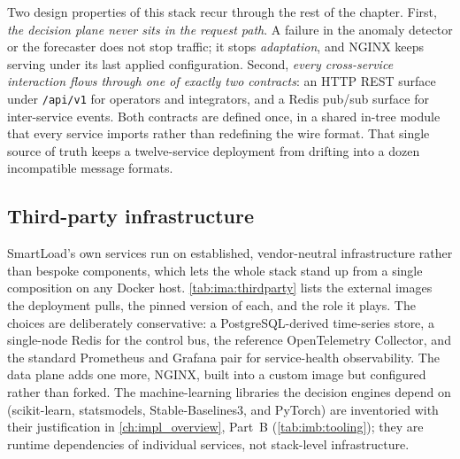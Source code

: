 Two design properties of this stack recur through the rest of the chapter. First,
\emph{the decision plane never sits in the request path}. A failure in the anomaly
detector or the forecaster does not stop traffic; it stops \emph{adaptation}, and
NGINX keeps serving under its last applied configuration. Second, \emph{every
cross-service interaction flows through one of exactly two contracts}: an HTTP REST
surface under \texttt{/api/v1} for operators and integrators, and a Redis pub/sub
surface for inter-service events. Both contracts are defined once, in a shared
in-tree module that every service imports rather than redefining the wire format.
That single source of truth keeps a twelve-service deployment from drifting into a
dozen incompatible message formats.

\subsection{Third-party infrastructure}
\label{sec:ima:thirdparty}

SmartLoad's own services run on established, vendor-neutral infrastructure rather
than bespoke components, which lets the whole stack stand up from a single
composition on any Docker host. \cref{tab:ima:thirdparty} lists the external images
the deployment pulls, the pinned version of each, and the role it plays. The
choices are deliberately conservative: a PostgreSQL-derived time-series store, a
single-node Redis for the control bus, the reference OpenTelemetry Collector, and
the standard Prometheus and Grafana pair for service-health observability. The data
plane adds one more, NGINX, built into a custom image but configured rather than
forked. The machine-learning libraries the decision engines depend on
(scikit-learn, statsmodels, Stable-Baselines3, and PyTorch) are inventoried with
their justification in \cref{ch:impl_overview}, Part~B (\cref{tab:imb:tooling});
they are runtime dependencies of individual services, not stack-level
infrastructure.

